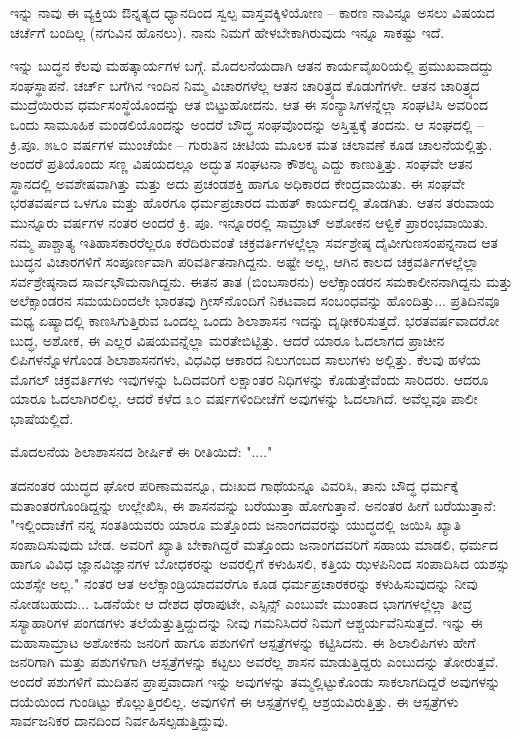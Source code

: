 ಇನ್ನು ನಾವು ಈ ವ್ಯಕ್ತಿಯ ಔನ್ನತ್ಯದ ಧ್ಯಾನದಿಂದ ಸ್ವಲ್ಪ ವಾಸ್ತವಕ್ಕಿಳಿಯೋಣ – ಕಾರಣ ನಾವಿನ್ನೂ ಅಸಲು ವಿಷಯದ ಚರ್ಚೆಗೆ ಬಂದಿಲ್ಲ (ನಗುವಿನ ಹೊನಲು). ನಾನು ನಿಮಗೆ ಹೇಳಬೇಕಾಗಿರುವುದು ಇನ್ನೂ ಸಾಕಷ್ಟು ಇದೆ.

ಇನ್ನು ಬುದ್ಧನ ಕೆಲವು ಮಹತ್ಕಾರ್ಯಗಳ ಬಗ್ಗೆ. ಮೊದಲನೆಯದಾಗಿ ಆತನ ಕಾರ್ಯವೈಖರಿಯಲ್ಲಿ ಪ್ರಮುಖವಾದದ್ದು ಸಂಘಸ್ಥಾಪನೆ. ಚರ್ಚ್ ಬಗೆಗಿನ ಇಂದಿನ ನಿಮ್ಮ ವಿಚಾರಗಳೆಲ್ಲ ಆತನ ಚಾರಿತ್ರ್ಯದ ಕೊಡುಗೆಗಳೇ. ಆತನ ಚಾರಿತ್ರ್ಯದ ಮುದ್ರೆಯಿರುವ ಧರ್ಮಸಂಸ್ಥೆಯೊಂದನ್ನು ಆತ ಬಿಟ್ಟುಹೋದನು. ಆತ ಈ ಸಂನ್ಯಾಸಿಗಳನ್ನೆಲ್ಲಾ ಸಂಘಟಿಸಿ ಅವರಿಂದ ಒಂದು ಸಾಮೂಹಿಕ ಮಂಡಲಿಯೊಂದನ್ನು ಅಂದರೆ ಬೌದ್ಧ ಸಂಘವೊಂದನ್ನು ಅಸ್ತಿತ್ವಕ್ಕೆ ತಂದನು. ಆ ಸಂಘದಲ್ಲಿ – ಕ್ರಿ.ಪೂ. ೫೬೦ ವರ್ಷಗಳ ಮುಂಚೆಯೇ – ಗುರುತಿನ ಚೀಟಿಯ ಮೂಲಕ ಮತ ಚಲಾವಣೆ ಕೂಡ ಚಾಲನೆಯಲ್ಲಿತ್ತು. ಅಂದರೆ ಪ್ರತಿಯೊಂದು ಸಣ್ಣ ವಿಷಯದಲ್ಲೂ ಅದ್ಭುತ ಸಂಘಟನಾ ಕೌಶಲ್ಯ ಎದ್ದು ಕಾಣುತ್ತಿತ್ತು. ಸಂಘವೇ ಆತನ ಸ್ಥಾನದಲ್ಲಿ ಅವಶೇಷವಾಗಿತ್ತು ಮತ್ತು ಅದು ಪ್ರಚಂಡಶಕ್ತಿ ಹಾಗೂ ಅಧಿಕಾರದ ಕೇಂದ್ರವಾಯಿತು. ಈ ಸಂಘವೇ ಭರತವರ್ಷದ ಒಳಗೂ ಮತ್ತು ಹೊರಗೂ ಧರ್ಮಪ್ರಚಾರದ ಮಹತ್ ಕಾರ್ಯದಲ್ಲಿ ತೊಡಗಿತು. ಆತನ ತರುವಾಯ ಮುನ್ನೂರು ವರ್ಷಗಳ ನಂತರ ಅಂದರೆ ಕ್ರಿ. ಪೂ. ಇನ್ನೂರರಲ್ಲಿ ಸಾಮ್ರಾಟ್ ಅಶೋಕನ ಆಳ್ವಿಕೆ ಪ್ರಾರಂಭವಾಯಿತು. ನಮ್ಮ ಪಾಶ್ಚಾತ್ಯ ಇತಿಹಾಸಕಾರರೆಲ್ಲರೂ ಕರೆದಿರುವಂತೆ ಚಕ್ರವರ್ತಿಗಳಲ್ಲೆಲ್ಲಾ ಸರ್ವಶ್ರೇಷ್ಠ ದೈವೀಗುಣಸಂಪನ್ನನಾದ ಆತ ಬುದ್ಧನ ವಿಚಾರಗಳಿಗೆ ಸಂಪೂರ್ಣವಾಗಿ ಪರಿವರ್ತಿತನಾಗಿದ್ದನು. ಅಷ್ಟೇ ಅಲ್ಲ, ಆಗಿನ ಕಾಲದ ಚಕ್ರವರ್ತಿಗಳಲ್ಲೆಲ್ಲಾ ಸರ್ವಶ್ರೇಷ್ಠನಾದ ಸಾರ್ವಭೌಮನಾಗಿದ್ದನು. ಈತನ ತಾತ (ಬಿಂಬಸಾರನು) ಅಲೆಕ್ಸಾಂಡರನ ಸಮಕಾಲೀನನಾಗಿದ್ದನು ಮತ್ತು ಅಲೆಕ್ಸಾಂಡರನ ಸಮಯದಿಂದಲೇ ಭಾರತವು ಗ್ರೀಸ್‌ನೊಂದಿಗೆ ನಿಕಟವಾದ ಸಂಬಂಧವನ್ನು ಹೊಂದಿತ್ತು... ಪ್ರತಿದಿನವೂ ಮಧ್ಯ ಏಷ್ಯಾದಲ್ಲಿ ಕಾಣಸಿಗುತ್ತಿರುವ ಒಂದಲ್ಲ ಒಂದು ಶಿಲಾಶಾಸನ ಇದನ್ನು ದೃಢೀಕರಿಸುತ್ತದೆ. ಭರತವರ್ಷವಾದರೋ ಬುದ್ಧ, ಅಶೋಕ, ಈ ಎಲ್ಲರ ವಿಷಯವನ್ನೆಲ್ಲಾ ಮರತೇಬಿಟ್ಟಿತ್ತು. ಆದರೆ ಯಾರೂ ಓದಲಾಗದ ಪ್ರಾಚೀನ ಲಿಪಿಗಳನ್ನೊಳಗೊಂಡ ಶಿಲಾಶಾಸನಗಳು, ವಿಧವಿಧ ಆಕಾರದ ನಿಲುಗಂಬದ ಸಾಲುಗಳು ಅಲ್ಲಿತ್ತು. ಕೆಲವು ಹಳೆಯ ಮೊಗಲ್ ಚಕ್ರವರ್ತಿಗಳು ಇವುಗಳನ್ನು ಓದಿದವರಿಗೆ ಲಕ್ಷಾಂತರ ನಿಧಿಗಳನ್ನು ಕೊಡುತ್ತೇವೆಂದು ಸಾರಿದರು. ಆದರೂ ಯಾರೂ ಓದಲಾಗಿರಲಿಲ್ಲ. ಆದರೆ ಕಳೆದ ೩೦ ವರ್ಷಗಳಿಂದೀಚೆಗೆ ಅವುಗಳನ್ನು ಓದಲಾಗಿದೆ. ಅವೆಲ್ಲವೂ ಪಾಲೀ ಭಾಷೆಯಲ್ಲಿದೆ.

ಮೊದಲನೆಯ ಶಿಲಾಶಾಸನದ ಶೀರ್ಷಿಕೆ ಈ ರೀತಿಯಿದೆ: "...."

ತದನಂತರ ಯುದ್ಧದ ಘೋರ ಪರಿಣಾಮವನ್ನೂ, ದುಃಖದ ಗಾಥೆಯನ್ನೂ ವಿವರಿಸಿ, ತಾನು ಬೌದ್ಧ ಧರ್ಮಕ್ಕೆ ಮತಾಂತರಗೊಂಡಿದ್ದನ್ನು ಉಲ್ಲೇಖಿಸಿ, ಈ ಶಾಸನವನ್ನು ಬರೆಯುತ್ತಾ ಹೋಗುತ್ತಾನೆ. ಅನಂತರ ಹೀಗೆ ಬರೆಯುತ್ತಾನೆ: "ಇಲ್ಲಿಂದಾಚೆಗೆ ನನ್ನ ಸಂತತಿಯವರು ಯಾರೂ ಮತ್ತೊಂದು ಜನಾಂಗದವರನ್ನು ಯುದ್ಧದಲ್ಲಿ ಜಯಿಸಿ ಖ್ಯಾತಿ ಸಂಪಾದಿಸುವುದು ಬೇಡ. ಅವರಿಗೆ ಖ್ಯಾತಿ ಬೇಕಾಗಿದ್ದರೆ ಮತ್ತೊಂದು ಜನಾಂಗದವರಿಗೆ ಸಹಾಯ ಮಾಡಲಿ, ಧರ್ಮದ ಹಾಗೂ ವಿವಿಧ ಜ್ಞಾನವಿಜ್ಞಾನಗಳ ಬೋಧಕರನ್ನು ಅವರಲ್ಲಿಗೆ ಕಳುಹಿಸಲಿ, ಕತ್ತಿಯ ಝಳಪಿನಿಂದ ಸಂಪಾದಿಸಿದ ಯಶಸ್ಸು ಯಶಸ್ಸೇ ಅಲ್ಲ." ನಂತರ ಆತ ಅಲೆಕ್ಸಾಂಡ್ರಿಯಾದವರೆಗೂ ಕೂಡ ಧರ್ಮಪ್ರಚಾರಕರನ್ನು ಕಳುಹಿಸುವುದನ್ನು ನೀವು ನೋಡಬಹುದು... ಒಡನೆಯೇ ಆ ದೇಶದ ಥೆರಾಪುಟೇ, ಎಸ್ಸಿನ್ಸ್ ಎಂಬುವೇ ಮುಂತಾದ ಭಾಗಗಳಲ್ಲೆಲ್ಲಾ ತೀವ್ರ ಸಸ್ಯಾಹಾರಿಗಳ ಪಂಗಡಗಳು ತಲೆಯೆತ್ತುತ್ತಿದ್ದುದನ್ನು ನೀವು ಗಮನಿಸಿದರೆ ನಿಮಗೆ ಆಶ್ಚರ್ಯವೆನಿಸುತ್ತದೆ. ಇನ್ನು ಈ ಮಹಾಸಾಮ್ರಾಟ ಅಶೋಕನು ಜನರಿಗೆ ಹಾಗೂ ಪಶುಗಳಿಗೆ ಆಸ್ಪತ್ರೆಗಳನ್ನು ಕಟ್ಟಿಸಿದನು. ಈ ಶಿಲಾಲಿಪಿಗಳು ಹೇಗೆ ಜನರಿಗಾಗಿ ಮತ್ತು ಪಶುಗಳಿಗಾಗಿ ಆಸ್ಪತ್ರೆಗಳನ್ನು ಕಟ್ಟಲು ಅವರೆಲ್ಲ ಶಾಸನ ಮಾಡುತ್ತಿದ್ದರು ಎಂಬುದನ್ನು ತೋರುತ್ತವೆ. ಅಂದರೆ ಪಶುಗಳಿಗೆ ಮುದಿತನ ಪ್ರಾಪ್ತವಾದಾಗ ಇನ್ನು ಅವುಗಳನ್ನು ತಮ್ಮಲ್ಲಿಟ್ಟುಕೊಂಡು ಸಾಕಲಾಗದಿದ್ದರೆ ಅವುಗಳನ್ನು ದಯೆಯಿಂದ ಗುಂಡಿಟ್ಟು ಕೊಲ್ಲುತ್ತಿರಲಿಲ್ಲ. ಅವುಗಳಿಗೆ ಈ ಆಸ್ಪತ್ರೆಗಳಲ್ಲಿ ಆಶ್ರಯವಿರುತ್ತಿತ್ತು. ಈ ಆಸ್ಪತ್ರೆಗಳು ಸಾರ್ವಜನಿಕರ ದಾನದಿಂದ ನಿರ್ವಹಿಸಲ್ಪಡುತ್ತಿದ್ದುವು.

